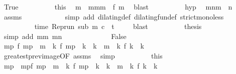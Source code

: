 \begin{isabellebody}
\ True\isanewline
\ \ \ \ \ \ \ \ \isamarkupfalse%
\ this\ \isamarkupfalse%
\ m\ \ mm{}{\isacharcolon}{\isacartoucheopen}m\ {\isacharequal}\ f\ m\ \isamarkupfalse%
\ blast\isanewline
\ \ \ \ \ \ \ \ \isamarkupfalse%
\ hyp\ \isamarkupfalse%
\ m{}n{\isacharcolon}{\isacartoucheopen}m\ {\isacharless}\ n{\isacartoucheclose}\ \isamarkupfalse%
\ assms{\isacharparenleft}{}{\isacharparenright}\isanewline
\ \ \ \ \ \ \ \ \ \ \isamarkupfalse%
\ {\isacharparenleft}simp\ add{\isacharcolon}\ dilating{\isacharunderscore}def\ dilating{\isacharunderscore}fun{\isacharunderscore}def\ strict{\isacharunderscore}mono{\isacharunderscore}less{\isacharparenright}\isanewline
\ \ \ \ \ \ \ \ \isamarkupfalse%
\ {\isacartoucheopen}time\ {\isacharparenleft}{\isacharparenleft}Rep{\isacharunderscore}run\ sub{\isacharparenright}\ m\ c{\isacharparenright}\ {\isacharless}\ t{\isacartoucheclose}\ \isamarkupfalse%
\ {\isacharasterisk}\ \isamarkupfalse%
\ blast\isanewline
\ \ \ \ \ \ \ \ \isamarkupfalse%
\ {\isacharquery}thesis\ \isamarkupfalse%
\ {\isacharparenleft}simp\ add{\isacharcolon}\ mm{}\ m{}n\ {\isacharasterisk}{\isacharasterisk}{\isacharparenright}\isanewline
\ \ \ \ \isamarkupfalse%
\isanewline
\ \ \ \ \ \ \isamarkupfalse%
\ False\isanewline
\ \ \ \ \ \ \ \ \isamarkupfalse%
\ {\isacartoucheopen}{\isasymexists}m\isactrlsub p{\isachardot}\ f\ m\isactrlsub p\ {\isacharless}\ m\ {\isasymand}\ {\isacharparenleft}{\isasymforall}k{\isachardot}\ f\ m\isactrlsub p\ {\isacharless}\ k\ {\isasymand}\ k\ {\isasymle}\ m\ {\isasymlongrightarrow}\ {\isacharparenleft}{\isasymnexists}k\ f\ k\ {\isacharequal}\ k{\isacharparenright}{\isacharparenright}{\isacartoucheclose}\isanewline
\ \ \ \ \ \ \ \ \ \ \isamarkupfalse%
\ greatest{\isacharunderscore}prev{\isacharunderscore}image{\isacharbrackleft}OF\ assms{\isacharbrackright}\ \isamarkupfalse%
\ simp\isanewline
\ \ \ \ \ \ \ \ \isamarkupfalse%
\ this\ \isamarkupfalse%
\ m\isactrlsub p\ \ mp{\isacharcolon}{\isacartoucheopen}f\ m\isactrlsub p\ {\isacharless}\ m\ {\isasymand}\ {\isacharparenleft}{\isasymforall}k{\isachardot}\ f\ m\isactrlsub p\ {\isacharless}\ k\ {\isasymand}\ k\ {\isasymle}\ m\ {\isasymlongrightarrow}\ {\isacharparenleft}{\isasymnexists}k\ f\ k\ {\isacharequal}\ k{\isacharparenright}{\isacharparenright}{\isacartoucheclose}\isanewline

\end{isabellebody}

